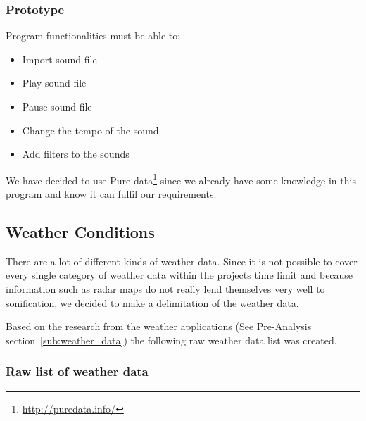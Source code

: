 

\subsubsection{Prototype} %
\label{ssub:prototype}

Program functionalities must be able to:
\begin{itemize}
    \item Import sound file
    \item Play sound file
    \item Pause sound file
    \item Change the tempo of the sound
    \item Add filters to the sounds
\end{itemize}

We have decided to use Pure data\footnote{\url{http://puredata.info/}} since we already have some knowledge in this program and know it can fulfil our requirements. 




\subsection{Weather Conditions} %
\label{sub:weather_conditions}

There are a lot of different kinds of weather data. 
Since it is not possible to cover every single category of weather data within the projects time limit and because information such as radar maps do not really lend themselves very well to sonification, we decided to make a delimitation of the weather data.

Based on the research from the weather applications (See Pre-Analysis section~\ref{sub:weather_data}) the following raw weather data list was created.

\subsubsection*{Raw list of weather data} %
\label{ssub:raw_list_of_weather_data}

